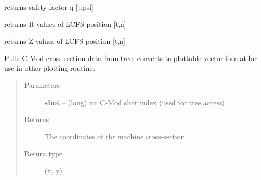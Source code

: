 \documentclass[letterpaper,10pt,english]{sphinxmanual}
\begin{document}
\begin{fulllineitems}
\begin{fulllineitems}
\end{fulllineitems}


\begin{fulllineitems}
\label{eqtools:eqtools.CModEFIT.CModEFITTree.getQProfile}
returns safety factor q {[}t,psi{]}

\end{fulllineitems}


\begin{fulllineitems}
\label{eqtools:eqtools.CModEFIT.CModEFITTree.getRLCFS}
returns R-values of LCFS position {[}t,n{]}

\end{fulllineitems}


\begin{fulllineitems}
\label{eqtools:eqtools.CModEFIT.CModEFITTree.getZLCFS}
returns Z-values of LCFS position {[}t,n{]}

\end{fulllineitems}


\begin{fulllineitems}
\label{eqtools:eqtools.CModEFIT.CModEFITTree.getMachineCrossSectionFull}
Pulls C-Mod cross-section data from tree, converts to plottable
vector format for use in other plotting routines
\begin{quote}\begin{description}
\item[{Parameters}] \leavevmode
\textbf{shot} -- (long) int
C-Mod shot index (used for tree access)

\item[{Returns}] \leavevmode
The coordinates of the machine cross-section.

\item[{Return type}] \leavevmode
(x, y)

\end{description}\end{quote}

\end{fulllineitems}


\end{fulllineitems}
\end{document}
